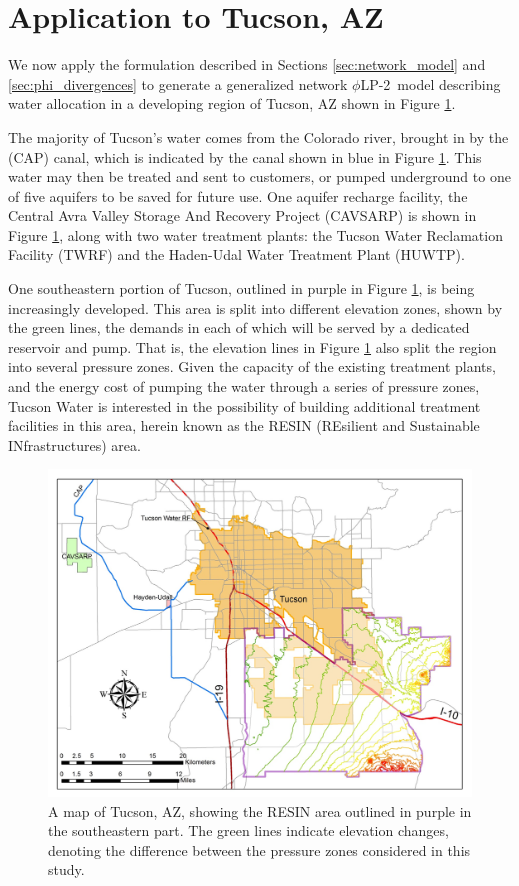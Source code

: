 \documentclass[opre,nonblindrev]{informs3} %
\newcommand{\plp}{$\phi$LP-2}
\begin{document}
\section{Application to Tucson, AZ}
\label{sec:water}

We now apply the formulation described in Sections \ref{sec:network_model} and \ref{sec:phi_divergences} to generate a generalized network \plp\ model describing water allocation in a developing region of Tucson, AZ shown in Figure \ref{fig:tucson_elevation}.

The majority of Tucson's water comes from the Colorado river, brought in by the (CAP) canal, which is indicated by the canal shown in blue in Figure \ref{fig:tucson_elevation}.
This water may then be treated and sent to customers, or pumped underground to one of five aquifers to be saved for future use.
One aquifer recharge facility, the Central Avra Valley Storage And Recovery Project (CAVSARP) is shown in Figure \ref{fig:tucson_elevation}, along with two water treatment plants: the Tucson Water Reclamation Facility (TWRF) and the Haden-Udal Water Treatment Plant (HUWTP).

One southeastern portion of Tucson, outlined in purple in Figure \ref{fig:tucson_elevation}, is being increasingly developed.
This area is split into different elevation zones, shown by the green lines, the demands in each of which will be served by a dedicated reservoir and pump.
That is, the elevation lines in Figure \ref{fig:tucson_elevation} also split the region into several pressure zones.
Given the capacity of the existing treatment plants, and the energy cost of pumping the water through a series of pressure zones, Tucson Water is interested in the possibility of building additional treatment facilities  in this area, herein known as the RESIN (REsilient and Sustainable INfrastructures) area.

\begin{figure}
	\FIGURE
	{%
		\includegraphics*[width=.6\textwidth]{tucson_water_images/tucson_elevation.png}%
	}
	{
		A map of Tucson, AZ, showing the RESIN area outlined in purple in the southeastern part.
		The green lines indicate elevation changes, denoting the difference between the pressure zones considered in this study.
		\label{fig:tucson_elevation}
	}
	{}
\end{figure}
\end{document}
